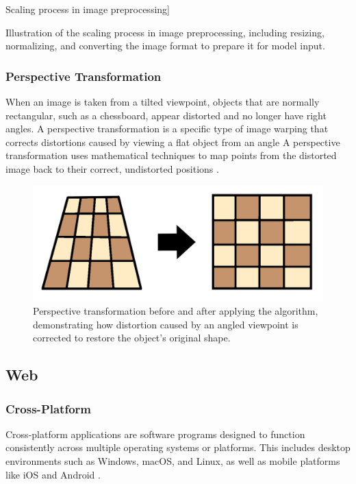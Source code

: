Scaling process in image preprocessing]{Illustration of the scaling process in image preprocessing, including resizing, normalizing, and converting the image format to prepare it for model input.

\subsubsection*{Perspective Transformation}

When an image is taken from a tilted viewpoint, objects that are normally rectangular, such as a chessboard, appear distorted and no longer have right angles. A perspective transformation is a specific type of image warping that corrects distortions caused by viewing a flat object from an angle A perspective transformation uses mathematical techniques to map points from the distorted image back to their correct, undistorted positions \cite{nvidia:perspective-transform}.


\begin{figure}[h!]
    \centering
    \includegraphics[width=0.75\linewidth]{figures/theory/image-recognition/perspective-transformation.png}
    \caption[Perspective transformation before and after]{Perspective transformation before and after applying the algorithm, demonstrating how distortion caused by an angled viewpoint is corrected to restore the object’s original shape.}
    \label{fig:perspective-transformation}
\end{figure}



\subsection{Web}
\label{subsec:web}

\subsubsection*{Cross-Platform}
\label{subsubsec:corss-platform}

Cross-platform applications are software programs designed to function consistently across multiple operating systems or platforms. This includes desktop environments such as Windows, macOS, and Linux, as well as mobile platforms like iOS and Android \cite{sevenpeaks:cross-platform}.

}
